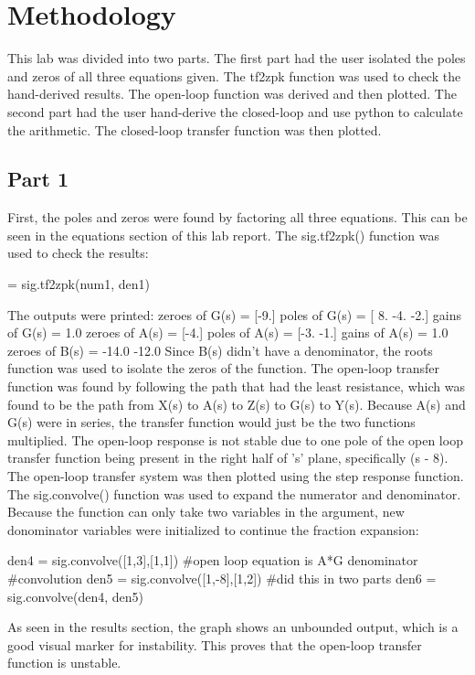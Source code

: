 \documentclass[12pt]{article}
\begin{document}
\section{ Methodology}
This lab was divided into two parts. The first part had the user isolated the poles and zeros of all three equations given. The tf2zpk function was used to check the hand-derived results. The open-loop function was derived and then plotted. The second part had the user hand-derive the closed-loop and use python to calculate the arithmetic. The closed-loop transfer function was then plotted.
\subsection{Part 1}
First, the poles and zeros were found by factoring all three equations. This can be seen in the equations section of this lab report. The sig.tf2zpk() function was used to check the results:
\begin{python}
[Z1,P1,K1] = sig.tf2zpk(num1, den1)
\end{python}
The outputs were printed:\newline
zeroes of G(s) =  [-9.]\newline
poles of G(s) =  [ 8. -4. -2.]\newline
gains of G(s) =  1.0\newline
zeroes of A(s) =  [-4.]\newline
poles of A(s) =  [-3. -1.]\newline
gains of A(s) =  1.0\newline
zeroes of B(s) =  -14.0 -12.0\newline
Since B(s) didn't have a denominator, the roots function was used to isolate the zeros of the function.\newline
The open-loop transfer function was found by following the path that had the least resistance, which was found to be the path from X(s) to A(s) to Z(s) to G(s) to Y(s). Because A(s) and G(s) were in series, the transfer function would just be the two functions multiplied. \newline
The open-loop response is not stable due to one pole of the open loop transfer function being present in the right half of 's' plane, specifically (s - 8).\newline
The open-loop transfer system was then plotted using the step response function. The sig.convolve() function was used to expand the numerator and denominator. Because the function can only take two variables in the argument, new donominator variables were initialized to continue the fraction expansion:
\begin{python}
den4 = sig.convolve([1,3],[1,1]) #open loop equation is A*G denominator
#convolution
den5 = sig.convolve([1,-8],[1,2])  #did this in two parts
den6 = sig.convolve(den4, den5)
\end{python}
As seen in the results section, the graph shows an unbounded output, which is a good visual marker for instability. This proves that the open-loop transfer function is unstable.
\end{document}
